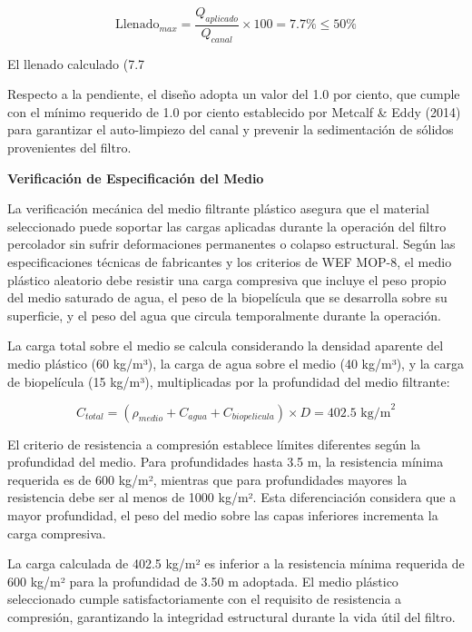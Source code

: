 \documentclass[12pt,a4paper]{article}
\begin{document}
\begin{equation}
\text{Llenado}_{max} = \frac{Q_{aplicado}}{Q_{canal}} \times 100 = 7.7 \% \leq 50 \%
\end{equation}

El llenado calculado (7.7%

Respecto a la pendiente, el diseño adopta un valor del 1.0 por ciento, que cumple con el mínimo requerido de 1.0 por ciento establecido por Metcalf \& Eddy (2014) para garantizar el auto-limpiezo del canal y prevenir la sedimentación de sólidos provenientes del filtro.

\textbf{Verificación de Especificación del Medio}

La verificación mecánica del medio filtrante plástico asegura que el material seleccionado puede soportar las cargas aplicadas durante la operación del filtro percolador sin sufrir deformaciones permanentes o colapso estructural. Según las especificaciones técnicas de fabricantes y los criterios de WEF MOP-8, el medio plástico aleatorio debe resistir una carga compresiva que incluye el peso propio del medio saturado de agua, el peso de la biopelícula que se desarrolla sobre su superficie, y el peso del agua que circula temporalmente durante la operación.

La carga total sobre el medio se calcula considerando la densidad aparente del medio plástico (60 kg/m³), la carga de agua sobre el medio (40 kg/m³), y la carga de biopelícula (15 kg/m³), multiplicadas por la profundidad del medio filtrante:

\begin{equation}
C_{total} = (\rho_{medio} + C_{agua} + C_{biopelicula}) \times D = 402.5 \text{ kg/m}^2
\end{equation}

El criterio de resistencia a compresión establece límites diferentes según la profundidad del medio. Para profundidades hasta 3.5 m, la resistencia mínima requerida es de 600 kg/m², mientras que para profundidades mayores la resistencia debe ser al menos de 1000 kg/m². Esta diferenciación considera que a mayor profundidad, el peso del medio sobre las capas inferiores incrementa la carga compresiva.

La carga calculada de 402.5 kg/m² es inferior a la resistencia mínima requerida de 600 kg/m² para la profundidad de 3.50 m adoptada. El medio plástico seleccionado cumple satisfactoriamente con el requisito de resistencia a compresión, garantizando la integridad estructural durante la vida útil del filtro.
\end{document}
